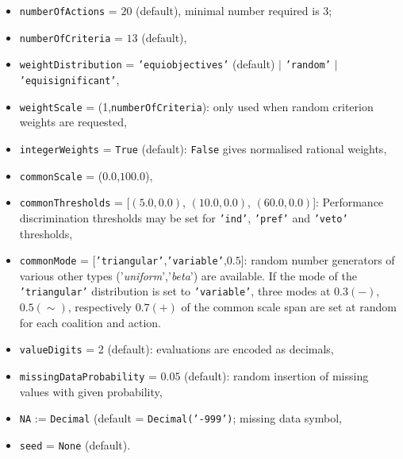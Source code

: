 \begin{itemize}[leftmargin=0.5cm,rightmargin=0.5cm]
\item \texttt{numberOfActions} = $20$ (default), minimal number required is 3; 
\item \texttt{numberOfCriteria} = $13$ (default),
\item \texttt{weightDistribution} = \texttt{'equiobjectives'} (default) $|$ \texttt{'random'} $|$ \texttt{'equisignificant'},
\item \texttt{weightScale} = (1,\texttt{numberOfCriteria}): only used when random criterion weights are requested,
\item \texttt{integerWeights} = \texttt{True} (default): \texttt{False} gives normalised rational weights, 
\item \texttt{commonScale} = ($0.0$,$100.0$),
\item \texttt{commonThresholds} = [$(5.0,0.0)$, $(10.0,0.0)$, $(60.0,0.0)$]: Performance discrimination thresholds may be set for \texttt{'ind'}, \texttt{'pref'} and \texttt{'veto'} thresholds,  
\item \texttt{commonMode} = [\texttt{'triangular'},\texttt{'variable'},$0.5$]: random number generators of various other types ('\emph{uniform}','\emph{beta}') are available. If the mode of the \texttt{'triangular'} distribution is set to \texttt{'variable'}, three modes at $0.3 (-)$, $0.5 (\sim)$, respectively $0.7 (+)$ of the common scale span are set at random for each coalition and action. 
\item \texttt{valueDigits} = 2 (default): evaluations are encoded as decimals,
\item \texttt{missingDataProbability} = $0.05$ (default): random insertion of missing values with given probability,  
\item \texttt{NA} := \texttt{Decimal} (default = \texttt{Decimal('-999')}; missing data symbol,
\item \texttt{seed} = \texttt{None} (default). 
\end{itemize}

